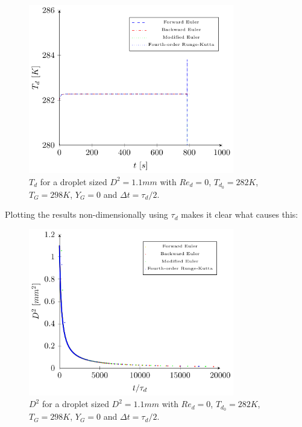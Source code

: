 \documentclass[../Interim_Report_Master]{subfiles}
\begin{document}
\begin{figure}[H]
	\centering
	\includegraphics[width=0.8\textwidth]{./Diagrams/Coupled_Heat_Mass_Transfer_tau_2/Coupled_Heat_Transfer_tau_2.pdf}
	\caption{$T_d$ for a droplet sized $D^2=1.1mm$ with $Re_d=0$, $T_{d_0}=282K$, $T_G=298K$, $Y_G=0$ and $\Delta t=\tau_d/2$.}
	\label{coupled_heat_tau_2}
\end{figure}

Plotting the results non-dimensionally using $\tau_d$ makes it clear what causes this:

\begin{figure}[H]
	\centering
	\includegraphics[width=0.8\textwidth]{./Diagrams/Coupled_Heat_Mass_Transfer_tau_2_nd/Coupled_d2_Transfer_tau_2_nd.pdf}
	\caption{$D^2$ for a droplet sized $D^2=1.1mm$ with $Re_d=0$, $T_{d_0}=282K$, $T_G=298K$, $Y_G=0$ and $\Delta t=\tau_d/2$.}
	\label{coupled_d2_tau_2_nd}
\end{figure}
\end{document}
